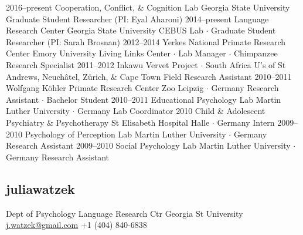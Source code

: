 \documentclass[]{friggeri-cv}
\begin{document}
\begin{entrylist}
  \entry
    {2016--present}
    {Cooperation, Conflict, \& Cognition Lab}
    {Georgia State University}
    {Graduate Student Researcher (PI: Eyal Aharoni)}
  \entry
    {2014--present}
    {Language Research Center}
    {Georgia State University}
    {CEBUS Lab $\cdot$ Graduate Student Researcher (PI: Sarah Brosnan)}
  \entry
    {2012--2014}
    {Yerkes National Primate Research Center}
    {Emory University}
    {Living Links Center $\cdot$ Lab Manager $\cdot$ Chimpanzee Research Specialist}
  \entry
    {2011--2012}
    {Inkawu Vervet Project $\cdot$ South Africa}
    {U's of St Andrews, Neuch\^{a}tel, Z\"urich, \& Cape Town}
    {Field Research Assistant}
  \entry
    {2010--2011}
    {Wolfgang K\"{o}hler Primate Research Center}
    {Zoo Leipzig $\cdot$ Germany}
    {Research Assistant $\cdot$ Bachelor Student}
  \entry
    {2010--2011}
    {Educational Psychology Lab}
    {Martin Luther University $\cdot$ Germany}
    {Lab Coordinator}
  \entry
    {2010}
    {Child \& Adolescent Psychiatry \& Psychotherapy}
    {St Elisabeth Hospital Halle $\cdot$ Germany}
    {Intern}
  \entry
    {2009--2010}
    {Psychology of Perception Lab}
    {Martin Luther University $\cdot$ Germany}
    {Research Assistant}
  \entry
    {2009--2010}
    {Social Psychology Lab}
    {Martin Luther University $\cdot$ Germany}
    {Research Assistant}
\end{entrylist}


\newpage
\thispagestyle{fancy}

\begin{aside}
  \section{{\normalfont julia}watzek}
    Dept of Psychology
    Language Research Ctr
    Georgia St University
    ~
    \href{mailto:j.watzek@gmail.com}{j.watzek@gmail.com}
    +1 (404) 840-6838
\end{aside}

\end{document}
